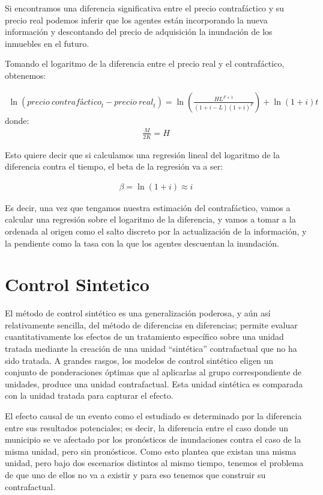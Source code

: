 \documentclass[12pt]{article}
\begin{document}
Si encontramos una diferencia significativa entre el precio contrafáctico y su precio real podemos inferir que los agentes están incorporando la nueva información y descontando del precio de adquisición la inundación de los inmuebles en el futuro.

Tomando el logaritmo de la diferencia entre el precio real y el contrafáctico, obtenemos:

\begin{align*}
\ln{({precio \ contrafáctico}_t - {precio \ real}_t)} = \ln{(\frac{HL^{F+1}}{(1+i-L)(1+i)^F})} + \ln(1+i)t
\end{align*}
donde:
\begin{align*}
\frac{M}{2K} = H
\end{align*}

Esto quiere decir que si calculamos una regresión lineal del logaritmo de la diferencia contra el tiempo, el beta de la regresión va a ser:

\begin{align*}
\beta=\ln(1+i) \approx i
\end{align*}

Es decir, una vez que tengamos nuestra estimación del contrafáctico, vamos a calcular una regresión sobre el logaritmo de la diferencia, y vamos a tomar a la ordenada al origen como el salto discreto por la actualización de la información, y la pendiente como la tasa con la que los agentes descuentan la inundación.
\pagebreak
\section{Control Sintetico}
\label{sec:Sintetico}

El método de control sintético es una generalización poderosa, y aún así relativamente sencilla, del método de diferencias en diferencias; permite evaluar cuantitativamente los efectos de un tratamiento específico sobre una unidad tratada mediante la creación de una unidad “sintética” contrafactual que no ha sido tratada. A grandes rasgos, los modelos de control sintético eligen un conjunto de ponderaciones óptimas que al aplicarlas al grupo correspondiente de unidades, produce una unidad contrafactual. Esta unidad sintética es comparada con la unidad tratada para capturar el efecto. 

El efecto causal de un evento como el estudiado es determinado por la diferencia entre sus resultados potenciales; es decir, la diferencia entre el caso donde un municipio se ve afectado por los pronósticos de inundaciones contra el caso de la misma unidad, pero sin pronósticos. Como esto plantea que existan una misma unidad, pero bajo dos escenarios distintos al mismo tiempo, tenemos el problema de que uno de ellos no va a existir y para eso tenemos que construir su contrafactual.
\end{document}
